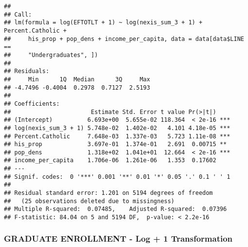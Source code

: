 \documentclass[]{article}
\newenvironment{Shaded}{\begin{snugshade}}{\end{snugshade}}
\newcommand{\KeywordTok}[1]{\textcolor[rgb]{0.13,0.29,0.53}{\textbf{#1}}}
\newcommand{\DataTypeTok}[1]{\textcolor[rgb]{0.13,0.29,0.53}{#1}}
\newcommand{\DecValTok}[1]{\textcolor[rgb]{0.00,0.00,0.81}{#1}}
\newcommand{\StringTok}[1]{\textcolor[rgb]{0.31,0.60,0.02}{#1}}
\newcommand{\OperatorTok}[1]{\textcolor[rgb]{0.81,0.36,0.00}{\textbf{#1}}}
\newcommand{\NormalTok}[1]{#1}
\begin{document}
\begin{verbatim}
## 
## Call:
## lm(formula = log(EFTOTLT + 1) ~ log(nexis_sum_3 + 1) + Percent.Catholic + 
##     his_prop + pop_dens + income_per_capita, data = data[data$LINE == 
##     "Undergraduates", ])
## 
## Residuals:
##     Min      1Q  Median      3Q     Max 
## -4.7496 -0.4004  0.2978  0.7127  2.5193 
## 
## Coefficients:
##                       Estimate Std. Error t value Pr(>|t|)    
## (Intercept)          6.693e+00  5.655e-02 118.364  < 2e-16 ***
## log(nexis_sum_3 + 1) 5.748e-02  1.402e-02   4.101 4.18e-05 ***
## Percent.Catholic     7.648e-03  1.337e-03   5.723 1.11e-08 ***
## his_prop             3.697e-01  1.374e-01   2.691  0.00715 ** 
## pop_dens             1.318e+02  1.041e+01  12.664  < 2e-16 ***
## income_per_capita    1.706e-06  1.261e-06   1.353  0.17602    
## ---
## Signif. codes:  0 '***' 0.001 '**' 0.01 '*' 0.05 '.' 0.1 ' ' 1
## 
## Residual standard error: 1.201 on 5194 degrees of freedom
##   (25 observations deleted due to missingness)
## Multiple R-squared:  0.07485,    Adjusted R-squared:  0.07396 
## F-statistic: 84.04 on 5 and 5194 DF,  p-value: < 2.2e-16
\end{verbatim}

\subsubsection{GRADUATE ENROLLMENT - Log + 1
Transformation}\label{graduate-enrollment---log-1-transformation}

\begin{Shaded}
\end{Shaded}
\end{document}

